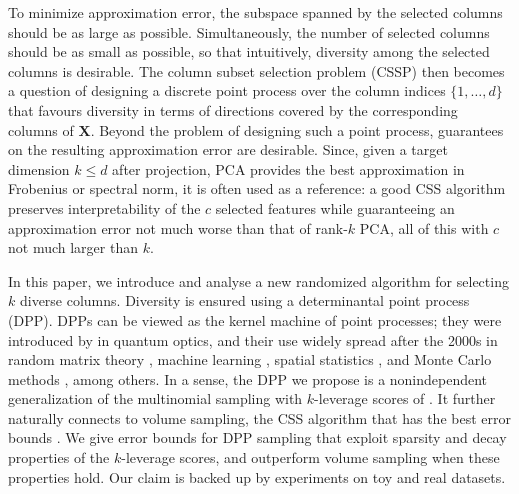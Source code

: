 \documentclass[twoside,11pt]{book}
\numberwithin{theorem}{chapter}
\numberwithin{definition}{chapter}
\numberwithin{proposition}{chapter}
\numberwithin{corollary}{chapter}
\numberwithin{example}{chapter}
\numberwithin{lemma}{chapter}
\newcommand{\pc}[1]{\textcolor{blue}{#1}}
\begin{document}
To minimize approximation error, the subspace spanned by the selected columns should be as large as possible. Simultaneously, the number of selected columns should be as small as possible, so that intuitively, diversity among the selected columns is desirable. The column subset selection problem (CSSP) then becomes a question of designing a discrete point process over the column indices $\{1,\dots,d\}$ that favours diversity in terms of directions covered by the corresponding columns of $\bm{X}$.
Beyond the problem of designing such a point process, guarantees on the resulting approximation error are desirable. Since, given a target dimension $k\leq d$ after projection, PCA provides the best approximation in Frobenius or spectral norm, it is often used as a reference: a good CSS algorithm preserves interpretability of the $c$ selected features while guaranteeing an approximation error not much worse than that of rank-$k$ PCA, all of this with $c$ not much larger than $k$.

In this paper, we introduce and analyse a new randomized algorithm for selecting $k$ diverse columns. Diversity is ensured using a determinantal point process (DPP). DPPs can be viewed as the kernel machine of point processes; they were introduced by \cite{Mac75} in quantum optics, and their use widely spread after the 2000s in random matrix theory \citep{Joh05}, machine learning \citep{KuTa12}, spatial statistics \citep{LaMoRu15}, and Monte Carlo methods \citep{BaHa16}, among others. In a sense, the DPP we propose is a nonindependent generalization of the multinomial sampling with $k$-leverage scores of \cite{BoMaDr09}. It further naturally connects to volume sampling, the CSS algorithm that has the best error bounds \citep{DRVW06}. We give error bounds for DPP sampling that exploit sparsity and decay properties of the $k$-leverage scores, and outperform volume sampling when these properties hold. Our claim is backed up by experiments on toy and real datasets.
\end{document}
